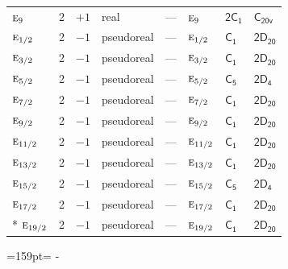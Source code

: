 \documentclass[10pt,a4paper]{article}
\makeatletter
\def\grouprule#1#2{\noalign{\marks\LTgroupmarks{\the\belowrulesep}\nobreak\vskip#1%
  \vskip\aboverulesep}\multispan\LT@cols\unskip{\leaders\hrule\@height#2\hfill\kern\z@}\cr
  \noalign{\penalty\LTrulebreak\vskip\belowrulesep\global\@lastruleclass\z@}}
\newcommand{\needspace}[1]{\par\penalty-100\begingroup\dimen0=#1\relax\dimen2=\pagegoal
  \advance\dimen2-\pagetotal\ifdim\dimen0>\dimen2\relax\ifdim\dimen2>0pt\vfil\break\fi\fi
  \endgroup}
\numberwithin{equation}{section}
\newcommand{\grp}[1]{\mathsf{#1}}
\newcommand{\irr}[1]{\text{\normalfont\scshape #1}}
\makeatother
\begin{document}
{\begin{longtable}{@{}lrrlllll@{}}
$\irr{e}_{9}$ & 2 & $+1$ & real & --- & $\irr{e}_{9}$ & \href{2C1.pdf}{$\grp{2C_{1}}$} & $\grp{C_{20v}}$\\
\grouprule{0pt}{\lightrulewidth}
$\irr{e}_{1/2}$ & 2 & $-1$ & pseudoreal & --- & $\irr{e}_{1/2}$ & \href{C1.pdf}{$\grp{C_{1}}$} & $\grp{2D_{20}}$\\
$\irr{e}_{3/2}$ & 2 & $-1$ & pseudoreal & --- & $\irr{e}_{3/2}$ & \href{C1.pdf}{$\grp{C_{1}}$} & $\grp{2D_{20}}$\\
$\irr{e}_{5/2}$ & 2 & $-1$ & pseudoreal & --- & $\irr{e}_{5/2}$ & \href{C5.pdf}{$\grp{C_{5}}$} & \href{2D4.pdf}{$\grp{2D_{4}}$}\\
$\irr{e}_{7/2}$ & 2 & $-1$ & pseudoreal & --- & $\irr{e}_{7/2}$ & \href{C1.pdf}{$\grp{C_{1}}$} & $\grp{2D_{20}}$\\
$\irr{e}_{9/2}$ & 2 & $-1$ & pseudoreal & --- & $\irr{e}_{9/2}$ & \href{C1.pdf}{$\grp{C_{1}}$} & $\grp{2D_{20}}$\\
$\irr{e}_{11/2}$ & 2 & $-1$ & pseudoreal & --- & $\irr{e}_{11/2}$ & \href{C1.pdf}{$\grp{C_{1}}$} & $\grp{2D_{20}}$\\
$\irr{e}_{13/2}$ & 2 & $-1$ & pseudoreal & --- & $\irr{e}_{13/2}$ & \href{C1.pdf}{$\grp{C_{1}}$} & $\grp{2D_{20}}$\\
$\irr{e}_{15/2}$ & 2 & $-1$ & pseudoreal & --- & $\irr{e}_{15/2}$ & \href{C5.pdf}{$\grp{C_{5}}$} & \href{2D4.pdf}{$\grp{2D_{4}}$}\\
$\irr{e}_{17/2}$ & 2 & $-1$ & pseudoreal & --- & $\irr{e}_{17/2}$ & \href{C1.pdf}{$\grp{C_{1}}$} & $\grp{2D_{20}}$\\*
$\irr{e}_{19/2}$ & 2 & $-1$ & pseudoreal & --- & $\irr{e}_{19/2}$ & \href{C1.pdf}{$\grp{C_{1}}$} & $\grp{2D_{20}}$\\
\bottomrule\end{longtable}}
\needspace{159pt}
\end{document}
